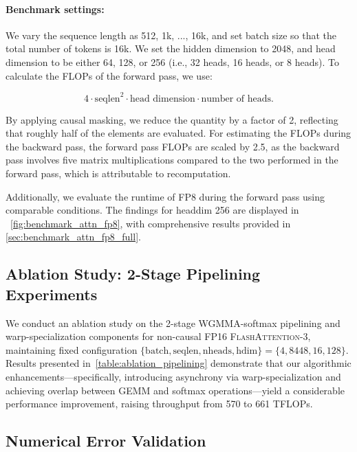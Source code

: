 \paragraph{Benchmark settings:} We vary the sequence length as 512, 1k, ..., 16k, and set batch size so that the total number of tokens is 16k. We set the hidden dimension to 2048, and head dimension to be either 64, 128, or 256 (i.e., 32 heads, 16 heads, or 8 heads). To calculate the FLOPs of the forward pass, we use:

\begin{equation*}
  4 \cdot \text{seqlen}^2 \cdot \text{head dimension} \cdot \text{number of heads}.
\end{equation*}

By applying causal masking, we reduce the quantity by a factor of 2, reflecting that roughly half of the elements are evaluated. For estimating the FLOPs during the backward pass, the forward pass FLOPs are scaled by 2.5, as the backward pass involves five matrix multiplications compared to the two performed in the forward pass, which is attributable to recomputation.

Additionally, we evaluate the runtime of FP8 during the forward pass using comparable conditions. The findings for headdim 256 are displayed in ~\cref{fig:benchmark_attn_fp8}, with comprehensive results provided in \cref{sec:benchmark_attn_fp8_full}.

\subsection{Ablation Study: 2-Stage Pipelining Experiments}
\label{sec:2-stage-pipelining-experiments}

We conduct an ablation study on the 2-stage WGMMA-softmax pipelining and warp-specialization components for non-causal FP16 \textsc{FlashAttention-3}, maintaining fixed configuration $\{\text{batch}, \text{seqlen}, \text{nheads}, \text{hdim}\} = \{ 4, 8448, 16, 128\}$. Results presented in~\cref{table:ablation_pipelining} demonstrate that our algorithmic enhancements—specifically, introducing asynchrony via warp-specialization and achieving overlap between GEMM and softmax operations—yield a considerable performance improvement, raising throughput from 570 to 661 TFLOPs.

\subsection{Numerical Error Validation}
\label{sec:numerical_error}

